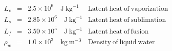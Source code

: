 \begin{eqnarray*}
\begin{array}{lcll}
L_{v} & = & 2.5 \times 10^{6} \quad\mathrm{J \: kg^{-1}} & \mathrm{ Latent \: heat \: of \: vaporization}\\
L_{s} & = & 2.85 \times 10^{6} \quad\mathrm{J \: kg^{-1}} & \mathrm{ Latent \: heat \: of \: sublimation}\\
L_{f} & = & 3.50 \times 10^{5} \quad\mathrm{J \: kg^{-1}} & \mathrm{ Latent \: heat \: of \: fusion}\\
\rho_{w} & = & 1.0 \times 10^{3} \quad\mathrm{kg \: m^{-3}} & \mathrm{ Density \: of \: liquid \: water}\\
\end{array}
\end{eqnarray*}

